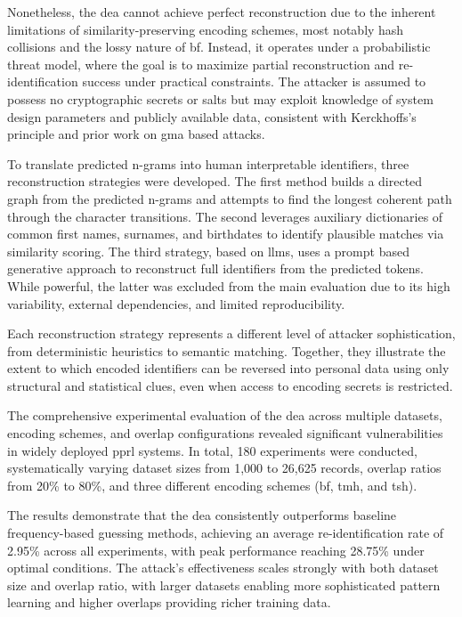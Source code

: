 Nonetheless, the \ac{dea} cannot achieve perfect reconstruction due to the inherent limitations of similarity-preserving encoding schemes, most notably hash collisions and the lossy nature of \ac{bf}.
Instead, it operates under a probabilistic threat model, where the goal is to maximize partial reconstruction and re-identification success under practical constraints.
The attacker is assumed to possess no cryptographic secrets or salts but may exploit knowledge of system design parameters and publicly available data, consistent with Kerckhoffs’s principle and prior work on \ac{gma} based attacks.

To translate predicted n-grams into human interpretable identifiers, three reconstruction strategies were developed.
The first method builds a directed graph from the predicted n-grams and attempts to find the longest coherent path through the character transitions.
The second leverages auxiliary dictionaries of common first names, surnames, and birthdates to identify plausible matches via similarity scoring.
The third strategy, based on \ac{llm}s, uses a prompt based generative approach to reconstruct full identifiers from the predicted tokens.
While powerful, the latter was excluded from the main evaluation due to its high variability, external dependencies, and limited reproducibility.

Each reconstruction strategy represents a different level of attacker sophistication, from deterministic heuristics to semantic matching.
Together, they illustrate the extent to which encoded identifiers can be reversed into personal data using only structural and statistical clues, even when access to encoding secrets is restricted.

The comprehensive experimental evaluation of the \ac{dea} across multiple datasets, encoding schemes, and overlap configurations revealed significant vulnerabilities in widely deployed \ac{pprl} systems.
In total, 180 experiments were conducted, systematically varying dataset sizes from 1,000 to 26,625 records, overlap ratios from 20\% to 80\%, and three different encoding schemes (\ac{bf}, \ac{tmh}, and \ac{tsh}).

The results demonstrate that the \ac{dea} consistently outperforms baseline frequency-based guessing methods, achieving an average re-identification rate of 2.95\% across all experiments, with peak performance reaching 28.75\% under optimal conditions.
The attack's effectiveness scales strongly with both dataset size and overlap ratio, with larger datasets enabling more sophisticated pattern learning and higher overlaps providing richer training data.

